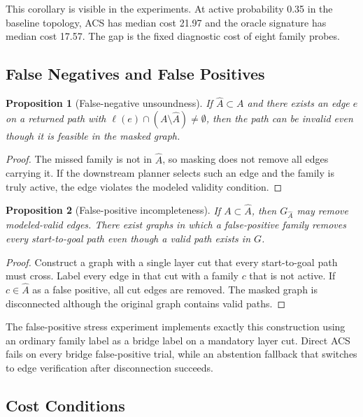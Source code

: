 \documentclass{article}
\newtheorem{proposition}{Proposition}
\newcommand{\ACS}{\textsc{ACS}}
\newcommand{\Ahat}{\hat{A}}
\newcommand{\Gmask}{G_{\Ahat}}
\begin{document}
This corollary is visible in the experiments. At active probability 0.35 in the baseline topology, \ACS{} has median cost 21.97 and the oracle signature has median cost 17.57. The gap is the fixed diagnostic cost of eight family probes.

\subsection{False Negatives and False Positives}

\begin{proposition}[False-negative unsoundness]
If $\Ahat\subset A$ and there exists an edge $e$ on a returned path with $\ell(e)\cap (A\setminus\Ahat)\neq \emptyset$, then the path can be invalid even though it is feasible in the masked graph.
\end{proposition}

\begin{proof}
The missed family is not in $\Ahat$, so masking does not remove all edges carrying it. If the downstream planner selects such an edge and the family is truly active, the edge violates the modeled validity condition.
\end{proof}

\begin{proposition}[False-positive incompleteness]
If $A\subset \Ahat$, then $\Gmask$ may remove modeled-valid edges. There exist graphs in which a false-positive family removes every start-to-goal path even though a valid path exists in $G$.
\end{proposition}

\begin{proof}
Construct a graph with a single layer cut that every start-to-goal path must cross. Label every edge in that cut with a family $c$ that is not active. If $c\in\Ahat$ as a false positive, all cut edges are removed. The masked graph is disconnected although the original graph contains valid paths.
\end{proof}

The false-positive stress experiment implements exactly this construction using an ordinary family label as a bridge label on a mandatory layer cut. Direct \ACS{} fails on every bridge false-positive trial, while an abstention fallback that switches to edge verification after disconnection succeeds.

\subsection{Cost Conditions}
\end{document}
